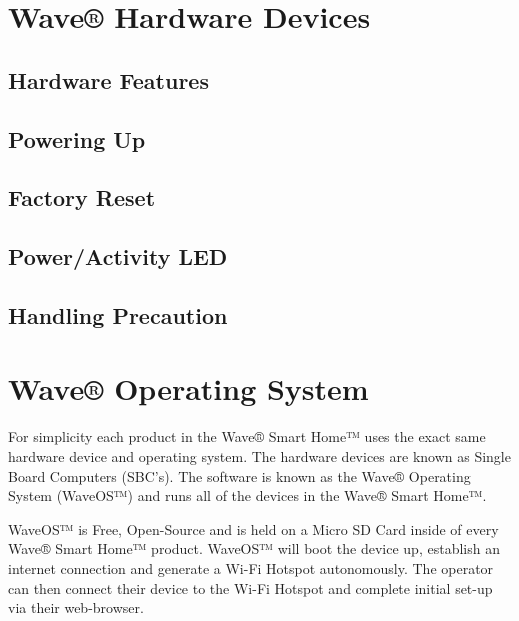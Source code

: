 \documentclass[letterpaper,10pt,openany,oneside,english]{sphinxmanual}
\begin{document}
\section{Wave® Hardware Devices}
\label{\detokenize{introduction:wave-hardware-devices}}

\subsection{Hardware Features}
\label{\detokenize{introduction:hardware-features}}

\subsection{Powering Up}
\label{\detokenize{introduction:powering-up}}

\subsection{Factory Reset}
\label{\detokenize{introduction:factory-reset}}

\subsection{Power/Activity LED}
\label{\detokenize{introduction:power-activity-led}}

\subsection{Handling Precaution}
\label{\detokenize{introduction:handling-precaution}}



\section{Wave® Operating System}
\label{\detokenize{introduction:wave-operating-system}}
For simplicity each product in the Wave® Smart Home™ uses the exact same hardware device and operating system.
The hardware devices are known as Single Board Computers (SBC’s).
The  software is known as the Wave® Operating System (WaveOS™) and runs all of the devices in the Wave® Smart Home™.

WaveOS™ is Free, Open-Source and is held on a Micro SD Card inside of every Wave® Smart Home™ product.
WaveOS™ will boot the device up, establish an internet connection and generate a Wi-Fi Hotspot autonomously.
The operator can then connect their device to the Wi-Fi Hotspot and complete initial set-up via their web-browser.
\end{document}
